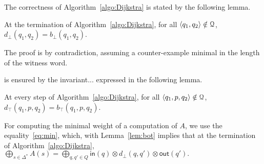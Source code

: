 %


The correctness of Algorithm~\ref{algo:Dijkstra}
is stated by the following lemma.

\begin{lemma}\label{lem:bot}
At the termination of Algorithm~\ref{algo:Dijkstra}, 
for all $\< q_1, q_2> \notin \Q$,
$d_\bot(q_1, q_2) =  b_\bot(q_1, q_2)$.
\end{lemma}

The proof is by contradiction,
assuming a counter-example minimal in the length of the witness word.

is ensured by the invariant... expressed in the following lemma.

\begin{lemma}\label{lem:top}
At every step of Algorithm~\ref{algo:Dijkstra}, 
for all $\< q_1, p, q_2> \notin \Q$,
$d_\top(q_1, p, q_2) = b_\top(q_1, p, q_2)$.
\end{lemma}

\noindent
For computing the minimal weight of a computation of $A$, we use the equality~\eqref{eq:min}, 
which, with Lemma~\ref{lem:bot} implies that
at the termination of Algorithm~\ref{algo:Dijkstra}, %
\(
  {\displaystyle \bigoplus_{s \in \Delta^*} A(s)} =
  {\displaystyle\bigoplus_{q, q' \in Q}} \textstyle
  \mathsf{in}(q) \mathop{\otimes} d_\bot(q, q') \mathop{\otimes} \mathsf{out}(q').
\)
